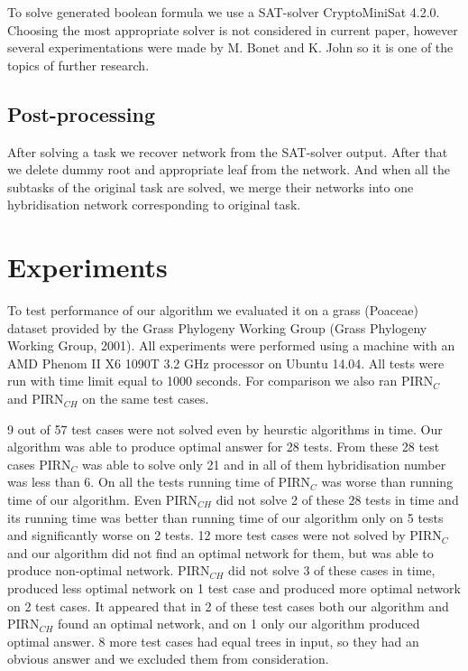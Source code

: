 \documentclass[runningheads, envcountsame, a4paper]{llncs}
\begin{document}
To solve generated boolean formula we use a SAT-solver CryptoMiniSat 4.2.0. Choosing the most appropriate solver 
is not considered in current paper, however several experimentations were made by M. Bonet and K. John \cite {bonet2009efficiently} 
so it is one of the topics of further research.

\subsection{Post-processing}

After solving a task we recover network from the SAT-solver output. After that we delete dummy root and appropriate 
leaf from the network. And when all the subtasks of the original task are solved, we merge their networks into one 
hybridisation network corresponding to original task.

\section{Experiments}

To test performance of our algorithm we evaluated it on a grass (Poaceae) dataset provided by the Grass Phylogeny Working Group 
(Grass Phylogeny Working Group, 2001). All experiments were performed using a machine with an AMD Phenom II X6 1090T 3.2 GHz 
processor on Ubuntu 14.04. All tests were run with time limit equal to 1000 seconds. For comparison we also ran PIRN$_C$ and PIRN$_{CH}$ 
on the same test cases. 

9 out of 57 test cases were not solved even by heurstic algorithms in time. Our algorithm was able to produce optimal answer for 28
tests. From these 28 test cases PIRN$_C$ was able to solve only 21 and in all of them hybridisation number was less than 6. 
On all the tests running time of PIRN$_C$ was worse than running time of our algorithm.
Even PIRN$_{CH}$ did not solve 2 of these 28 tests in time and its running time was better than running time of our algorithm only
on 5 tests and significantly worse on 2 tests. 12 more test cases were not solved by PIRN$_C$ and our algorithm did not find an optimal network for them, but was able to produce non-optimal network. PIRN$_{CH}$ did not solve 3 of these cases in time, produced less optimal 
network on 1 test case and produced more optimal network on 2 test cases. It appeared that in 2 of these test cases both our algorithm 
and PIRN$_{CH}$ found an optimal network, and on 1 only our algorithm produced optimal answer. 8 more test cases had equal trees in input, 
so they had an obvious answer and we excluded them from consideration.
\end{document}
